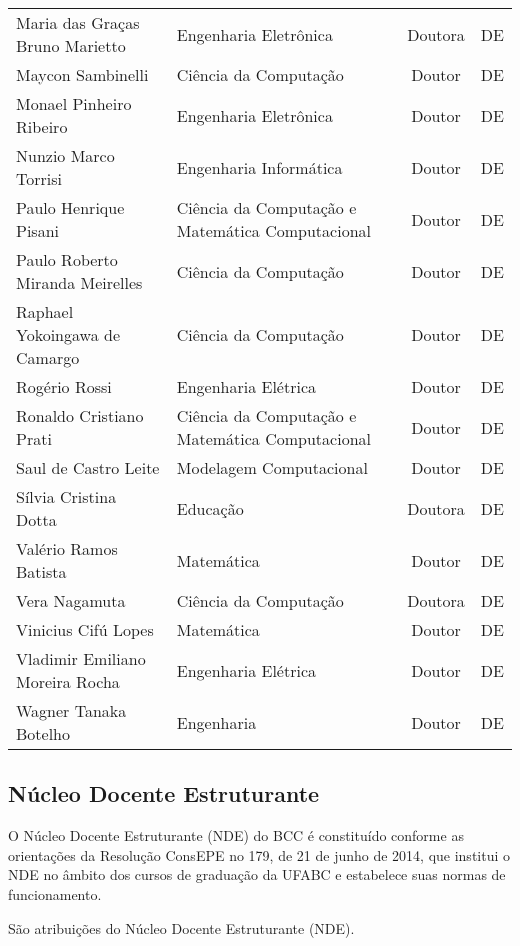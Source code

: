 \begin{longtable}{|l|l|c|c|}
	Maria das Graças Bruno Marietto & Engenharia Eletrônica & Doutora & DE \\
	Maycon Sambinelli &Ciência da Computação  & Doutor & DE \\
	Monael Pinheiro Ribeiro & Engenharia Eletrônica & Doutor & DE \\
	Nunzio Marco Torrisi & Engenharia Informática & Doutor & DE \\
	Paulo Henrique Pisani & Ciência da Computação e Matemática Computacional & Doutor & DE \\
	Paulo Roberto Miranda Meirelles & Ciência da Computação & Doutor & DE \\
	Raphael Yokoingawa de Camargo & Ciência da Computação & Doutor & DE \\
	Rogério Rossi & Engenharia Elétrica & Doutor & DE \\
	Ronaldo Cristiano Prati & Ciência da Computação e Matemática Computacional & Doutor & DE \\
	Saul de Castro Leite & Modelagem Computacional & Doutor & DE \\
	Sílvia Cristina Dotta & Educação & Doutora & DE \\
	Valério Ramos Batista & Matemática & Doutor & DE \\
	Vera Nagamuta & Ciência da Computação & Doutora & DE \\
	Vinicius Cifú Lopes & Matemática & Doutor & DE \\
	Vladimir Emiliano Moreira Rocha & Engenharia Elétrica & Doutor & DE \\
	Wagner Tanaka Botelho & Engenharia & Doutor & DE \\
	\hline
	
\end{longtable}


\subsection{Núcleo Docente Estruturante}

O Núcleo Docente Estruturante (NDE) do BCC é constituído conforme as orientações da Resolução ConsEPE no 179, de 21 de junho de 2014, que institui o NDE no âmbito dos cursos 
de graduação da UFABC e estabelece suas normas de funcionamento. 

São atribuições do Núcleo Docente Estruturante (NDE).

